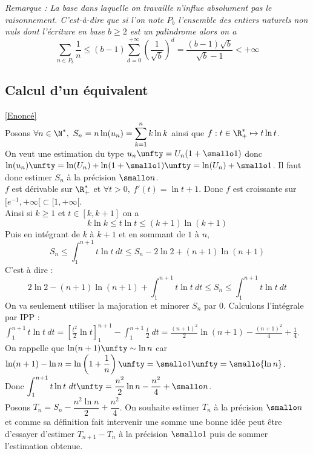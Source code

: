 \documentclass{book}
\begin{document}
	\textit{Remarque : La base dans laquelle on travaille n'influe absolument pas le raisonnement. C'est-à-dire que si l'on note $P_b$ l'ensemble des entiers naturels non nuls dont l'écriture en base $b\geq 2$ est un palindrome alors on a
	$$\displaystyle\sum_{n\in P_b}\frac{1}{n}\leq (b-1)\sum_{d=0}^{+\infty}\left(\frac{1}{\sqrt b}\right)^d=\frac{(b-1)\sqrt b}{\sqrt b-1}<+\infty$$}
	
	\subsection{Calcul d'un équivalent }
	\label{Calcul d'un équivalent corrigé}
	\textcolor{blue}{\hyperref[Calcul d'un équivalent]{[Enoncé]}}\\
	Posons $\forall n\in \N^*,\ S_n=n\ln(u_n)=\displaystyle\sum_{k=1}^nk\ln k$ ainsi que $f:t\in \R^*_+\mapsto t\ln t$.\\
	On veut une estimation du type $u_n\unfty=U_n(1+\smallo 1)$ donc $\ln(u_n)\unfty=\ln(U_n)+\ln(1+\smallo 1)\unfty=\ln(U_n)+\smallo 1$. Il faut donc estimer $S_n$ à la précision $\smallo n$.\\
	$f$ est dérivable sur $\R^*_+$ et $\forall t>0,\ f'(t)=\ln t+1$. Donc $f$ est croissante sur $[e^{-1},+\infty[\subset [1,+\infty[$.\\
	Ainsi si $k\geq 1$ et $t\in [k,k+1]$ on a
	$$k\ln k\leq t\ln t\leq (k+1)\ln(k+1)$$
	Puis en intégrant de $k$ à $k+1$ et en sommant de $1$ à $n$,
	$$S_n\leq\int_1^{n+1}t\ln t\ dt\leq S_n-2\ln 2+(n+1)\ln(n+1)$$
	C'est à dire :
	$$2\ln 2-(n+1)\ln(n+1)+\int_1^{n+1}t\ln t\ dt\leq S_n\leq \int_1^{n+1}t\ln t\ dt$$
	On va seulement utiliser la majoration et minorer $S_n$ par $0$.
	Calculons l'intégrale par IPP :\\
	$\displaystyle\int_1^{n+1}t\ln t\ dt=\left[\frac{t^2}{2}\ln t\right]_1^{n+1}-\int_1^{n+1}\frac{t}{2}\ dt=\frac{(n+1)^2}{2}\ln(n+1)-\frac{(n+1)^2}{4}+\frac{1}{4}$.\\
	On rappelle que $\ln(n+1)\unfty\sim\ln n$ car $\ln(n+1)-\ln n=\displaystyle\ln\left(1+\frac{1}{n}\right)\unfty=\smallo 1\unfty=\smallo{\ln n}$.\\
	Donc $\displaystyle\int_1^{n+1}t\ln t\ dt\unfty=\frac{n^2}{2}\ln n-\frac{n^2}{4}+\smallo n$.\\
	Posons $T_n=S_n-\dfrac{n^2\ln n}{2}+\dfrac{n^2}{4}$. On souhaite estimer $T_n$ à la précision $\smallo n$ et comme sa définition fait intervenir une somme une bonne idée peut être d'essayer d'estimer $T_{n+1}-T_n$ à la précision $\smallo 1$ puis de sommer l'estimation obtenue.
\end{document}
